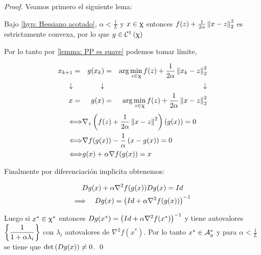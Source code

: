 \begin{proof}
	Veamos primero el siguiente lema:
	
	
	\begin{lemma}
		\label{lemma: PP es suave}
		Bajo \ref{hyp: Hessiano acotado}, $\alpha < \frac{1}{L}$ y $x \in \upchi$ entonces $f(z) + \frac{1}{2 \alpha} \left\lVert x- z\right\rVert_2^2$ es estrictamente convexa, por lo que $g \in \mathcal{C}^1 \left(\upchi\right)$
	\end{lemma}
	
	Por lo tanto por \ref{lemma: PP es suave} podemos tomar l\'imite, \ie
	
	\begin{equation*}
	\begin{aligned}
	x_{k+1} & = & g(x_k) & = & \arg \min\limits_{z \in \upchi}{f(z) + \dfrac{1}{2\alpha}\left\lVert x_k - z\right\rVert_{2}^{2}} \\
	\downarrow & & \downarrow & & \downarrow \\
	x & = & g(x) & = & \arg \min\limits_{z \in \upchi}{f(z) + \dfrac{1}{2\alpha}\left\lVert x - z\right\rVert_{2}^{2}}
	\end{aligned}
	\end{equation*}
	\begin{equation*}
	\begin{aligned}
	\Longleftrightarrow & \nabla_z \left(f(z) + \frac{1}{2 \alpha} \left\lVert x-z\right\rVert^2\right)(g(x)) = 0 \\
	\Longleftrightarrow & \nabla f(g(x)) - \frac{1}{\alpha} \left(x-g(x)\right) = 0 \\
	\Longleftrightarrow & g(x) + \alpha \nabla f(g(x)) = x
	\end{aligned}
	\end{equation*}
	
	Finalmente por diferenciaci\'on implicita obtenemos:
	
	\begin{gather*}
		Dg(x) + \alpha\nabla^2 f (g(x))Dg(x) = Id \\
		\Longrightarrow \quad Dg(x) = \left(Id + \alpha \nabla^2 f(g(x))\right)^{-1}
	\end{gather*}

	Luego si $x^* \in \upchi^*$ entonces $Dg(x^*) = \left(Id + \alpha \nabla^2 f(x^*)\right)^{-1}$ y tiene autovalores $\left\lbrace\dfrac{1}{1+ \alpha \lambda_i}\right\rbrace$ con $\lambda_i$ autovalores de $\nabla^2 f(x^*)$. Por lo tanto $x^* \in \mathcal{A}_{g}^{*}$ y para $\alpha < \frac{1}{L}$ se tiene que $\det \left(Dg(x)\right) \neq 0$. \qed
	
\end{proof}


